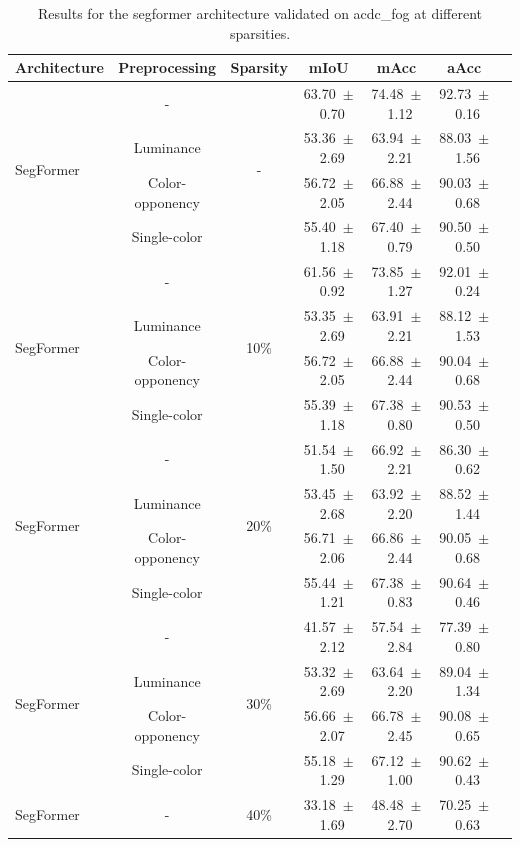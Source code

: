\begin{table}[h]
\centering
\caption{Results for the segformer architecture validated on acdc_fog at different sparsities.}
\begin{tabular}{@{}lccc ccc@{}}
\toprule
Architecture & Preprocessing & Sparsity & mIoU & mAcc & aAcc \\
\midrule

\multirow{4}{*}{SegFormer} & - & \multirow{4}{*}{-} & 63.70~$\pm$~0.70 & 74.48~$\pm$~1.12 & 92.73~$\pm$~0.16 \\
& Luminance & & 53.36~$\pm$~2.69 & 63.94~$\pm$~2.21 & 88.03~$\pm$~1.56 \\
& Color-opponency & & 56.72~$\pm$~2.05 & 66.88~$\pm$~2.44 & 90.03~$\pm$~0.68 \\
& Single-color & & 55.40~$\pm$~1.18 & 67.40~$\pm$~0.79 & 90.50~$\pm$~0.50 \\
\midrule
\multirow{4}{*}{SegFormer} & - & \multirow{4}{*}{10\%} & 61.56~$\pm$~0.92 & 73.85~$\pm$~1.27 & 92.01~$\pm$~0.24 \\
& Luminance & & 53.35~$\pm$~2.69 & 63.91~$\pm$~2.21 & 88.12~$\pm$~1.53 \\
& Color-opponency & & 56.72~$\pm$~2.05 & 66.88~$\pm$~2.44 & 90.04~$\pm$~0.68 \\
& Single-color & & 55.39~$\pm$~1.18 & 67.38~$\pm$~0.80 & 90.53~$\pm$~0.50 \\
\midrule
\multirow{4}{*}{SegFormer} & - & \multirow{4}{*}{20\%} & 51.54~$\pm$~1.50 & 66.92~$\pm$~2.21 & 86.30~$\pm$~0.62 \\
& Luminance & & 53.45~$\pm$~2.68 & 63.92~$\pm$~2.20 & 88.52~$\pm$~1.44 \\
& Color-opponency & & 56.71~$\pm$~2.06 & 66.86~$\pm$~2.44 & 90.05~$\pm$~0.68 \\
& Single-color & & 55.44~$\pm$~1.21 & 67.38~$\pm$~0.83 & 90.64~$\pm$~0.46 \\
\midrule
\multirow{4}{*}{SegFormer} & - & \multirow{4}{*}{30\%} & 41.57~$\pm$~2.12 & 57.54~$\pm$~2.84 & 77.39~$\pm$~0.80 \\
& Luminance & & 53.32~$\pm$~2.69 & 63.64~$\pm$~2.20 & 89.04~$\pm$~1.34 \\
& Color-opponency & & 56.66~$\pm$~2.07 & 66.78~$\pm$~2.45 & 90.08~$\pm$~0.65 \\
& Single-color & & 55.18~$\pm$~1.29 & 67.12~$\pm$~1.00 & 90.62~$\pm$~0.43 \\
\midrule
\multirow{4}{*}{SegFormer} & - & \multirow{4}{*}{40\%} & 33.18~$\pm$~1.69 & 48.48~$\pm$~2.70 & 70.25~$\pm$~0.63 \\

\end{tabular}
\end{table}
